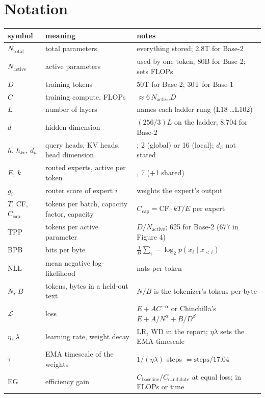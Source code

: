 \documentclass[11pt,letterpaper]{article}
\newcommand{\Nact}{N_{\mathrm{active}}}
\newcommand{\Ntot}{N_{\mathrm{total}}}\newcommand{\Neff}{N_{\mathrm{eff}}}
\begin{document}
\section{Notation}

\begin{center}\footnotesize\setlength{\tabcolsep}{4pt}
\begin{tabular}{@{}l>{\raggedright\arraybackslash}p{4.8cm}>{\raggedright\arraybackslash}p{8.4cm}@{}}
\toprule
symbol & meaning & notes\\
\midrule
$\Ntot$ & total parameters & everything stored; 2.8T for Base-2\\
$\Nact$ & active parameters & used by one token; 80B for Base-2; sets FLOPs\\
$D$ & training tokens & 50T for Base-2; 30T for Base-1\\
$C$ & training compute, FLOPs & $\approx6\,\Nact D$\\
$L$ & number of layers & names each ladder rung (L18 \dots L102)\\
$d$ & hidden dimension & $(256/3)L$ on the ladder; 8,704 for Base-2\\
$h$, $h_{kv}$, $d_h$ & query heads, KV heads, head dimension & 96; 2 (global) or 16 (local); $d_h$ not stated\\
$E$, $k$ & routed experts, active per token & 512, 7 (+1 shared)\\
$g_i$ & router score of expert $i$ & weights the expert's output\\
$T$, CF, $C_{\text{cap}}$ & tokens per batch, capacity factor, capacity & $C_{\text{cap}}=\text{CF}\cdot kT/E$ per expert\\
TPP & tokens per active parameter & $D/\Nact$; 625 for Base-2 (677 in Figure 4)\\
BPB & bits per byte & $\frac1B\sum_i-\log_2p(x_i\mid x_{<i})$\\
$\overline{\text{NLL}}$ & mean negative log-likelihood & nats per token\\
$N$, $B$ & tokens, bytes in a held-out text & $N/B$ is the tokenizer's tokens per byte\\
$\mathcal{L}$ & loss & $E+AC^{-\alpha}$ or Chinchilla's $E+A/N^\alpha+B/D^\beta$\\
$\eta$, $\lambda$ & learning rate, weight decay & LR, WD in the report; $\eta\lambda$ sets the EMA timescale\\
$\tau$ & EMA timescale of the weights & $1/(\eta\lambda)$ steps $=\text{steps}/17.04$\\
EG & efficiency gain & $C_{\text{baseline}}/C_{\text{candidate}}$ at equal loss; in FLOPs or time\\

\end{tabular}
\end{center}
\end{document}
